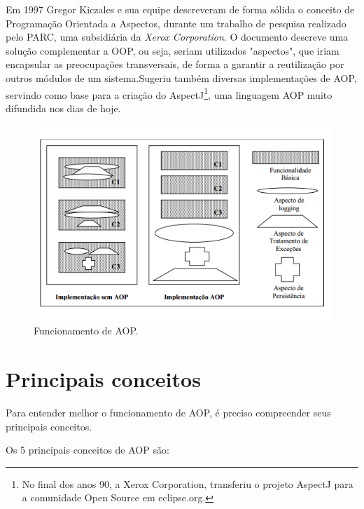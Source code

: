 \documentclass[tc,openright]{iiufrgs}
\begin{document}
Em 1997 Gregor Kiczales e sua equipe descreveram de forma sólida o conceito de Programação Orientada a Aspectos, durante um trabalho de pesquisa realizado pelo PARC, uma subsidiária da \textit{Xerox Corporation}. O documento descreve uma solução complementar a OOP, ou seja, seriam utilizados "aspectos", que iriam encapsular as preocupações transversais, de forma a garantir a reutilização por outros módulos de um sistema.Sugeriu também diversas implementações de AOP, servindo como base para a criação do AspectJ\footnote{No final dos anos 90, a Xerox Corporation, transferiu o projeto AspectJ para a comunidade Open Source em eclipse.org.}, uma linguagem AOP muito difundida nos dias de hoje.\cite{groves2013aop}

\begin{figure}[ht]
	\centering
	\includegraphics[scale=0.6]{figuras/funcionamentoAOP.png}
	\caption{Funcionamento de AOP.}
	\label{fig:funcionamentoAOP}
\end{figure}

\section{Principais conceitos}

Para entender melhor o funcionamento de AOP, é preciso compreender seus principais conceitos. 

Os 5 principais conceitos de AOP são:
\end{document}
